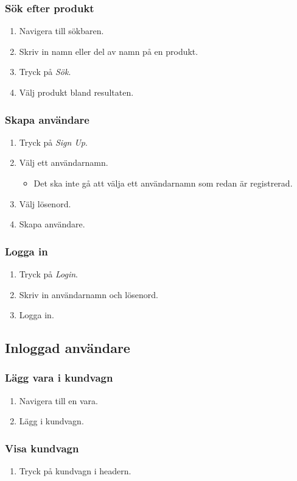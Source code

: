 \documentclass[a4paper]{article}
\begin{document}
\subsubsection{Sök efter produkt}
\begin{enumerate}
  \item Navigera till sökbaren.
  \item Skriv in namn eller del av namn på en produkt.
  \item Tryck på \textit{Sök}.
  \item Välj produkt bland resultaten.
\end{enumerate}
%
\subsubsection{Skapa användare}
\begin{enumerate}
\item Tryck på \textit{Sign Up}.
\item Välj ett användarnamn.
\begin{itemize}
  \item Det ska inte gå att välja ett användarnamn som redan är registrerad.
\end{itemize}
\item Välj lösenord.
\item Skapa användare.
\end{enumerate}
%
\subsubsection{Logga in}
\begin{enumerate}
  \item Tryck på \textit{Login}.
  \item Skriv in användarnamn och lösenord.
  \item Logga in.
\end{enumerate}
%
\subsection{Inloggad användare}
\subsubsection{Lägg vara i kundvagn}
\begin{enumerate}
  \item Navigera till en vara.
  \item Lägg i kundvagn.
\end{enumerate}
%
\subsubsection{Visa kundvagn}
\begin{enumerate}
  \item Tryck på kundvagn i headern.
\end{enumerate}
%
\end{document}
